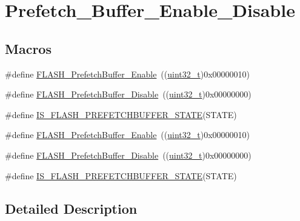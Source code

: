 \hypertarget{group___prefetch___buffer___enable___disable}{}\section{Prefetch\+\_\+\+Buffer\+\_\+\+Enable\+\_\+\+Disable}
\label{group___prefetch___buffer___enable___disable}
\subsection*{Macros}
\begin{DoxyCompactItemize}
\item 
\#define \hyperlink{group___prefetch___buffer___enable___disable_gad0fac43d078a77794f22840f326a6ed9}{F\+L\+A\+S\+H\+\_\+\+Prefetch\+Buffer\+\_\+\+Enable}~((\hyperlink{_p_e___types_8h_a33594304e786b158f3fb30289278f5af}{uint32\+\_\+t})0x00000010)
\item 
\#define \hyperlink{group___prefetch___buffer___enable___disable_ga2feb631ad85449f83517f05aaf4ba26c}{F\+L\+A\+S\+H\+\_\+\+Prefetch\+Buffer\+\_\+\+Disable}~((\hyperlink{_p_e___types_8h_a33594304e786b158f3fb30289278f5af}{uint32\+\_\+t})0x00000000)
\item 
\#define \hyperlink{group___prefetch___buffer___enable___disable_ga5fd6932c4f4e157a1d6e73d433df092f}{I\+S\+\_\+\+F\+L\+A\+S\+H\+\_\+\+P\+R\+E\+F\+E\+T\+C\+H\+B\+U\+F\+F\+E\+R\+\_\+\+S\+T\+A\+TE}(S\+T\+A\+TE)
\item 
\#define \hyperlink{group___prefetch___buffer___enable___disable_gad0fac43d078a77794f22840f326a6ed9}{F\+L\+A\+S\+H\+\_\+\+Prefetch\+Buffer\+\_\+\+Enable}~((\hyperlink{_p_e___types_8h_a33594304e786b158f3fb30289278f5af}{uint32\+\_\+t})0x00000010)
\item 
\#define \hyperlink{group___prefetch___buffer___enable___disable_ga2feb631ad85449f83517f05aaf4ba26c}{F\+L\+A\+S\+H\+\_\+\+Prefetch\+Buffer\+\_\+\+Disable}~((\hyperlink{_p_e___types_8h_a33594304e786b158f3fb30289278f5af}{uint32\+\_\+t})0x00000000)
\item 
\#define \hyperlink{group___prefetch___buffer___enable___disable_ga5fd6932c4f4e157a1d6e73d433df092f}{I\+S\+\_\+\+F\+L\+A\+S\+H\+\_\+\+P\+R\+E\+F\+E\+T\+C\+H\+B\+U\+F\+F\+E\+R\+\_\+\+S\+T\+A\+TE}(S\+T\+A\+TE)
\end{DoxyCompactItemize}


\subsection{Detailed Description}


